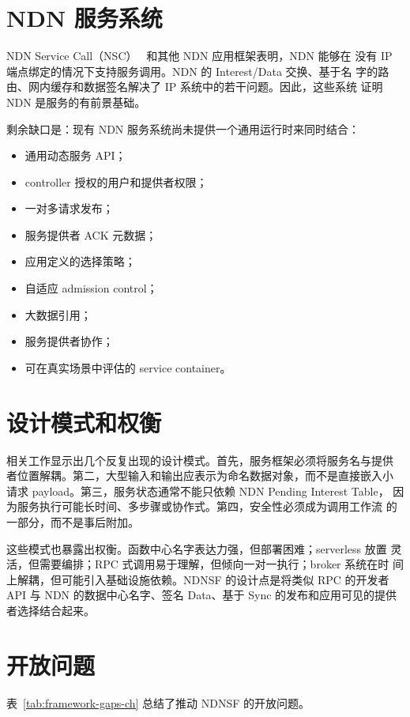 \section{NDN 服务系统}

NDN Service Call（NSC）~\cite{nsc} 和其他 NDN 应用框架表明，NDN 能够在
没有 IP 端点绑定的情况下支持服务调用。NDN 的 Interest/Data 交换、基于名
字的路由、网内缓存和数据签名解决了 IP 系统中的若干问题。因此，这些系统
证明 NDN 是服务的有前景基础。

剩余缺口是：现有 NDN 服务系统尚未提供一个通用运行时来同时结合：

\begin{itemize}
  \item 通用动态服务 API；
  \item controller 授权的用户和提供者权限；
  \item 一对多请求发布；
  \item 服务提供者 ACK 元数据；
  \item 应用定义的选择策略；
  \item 自适应 admission control；
  \item 大数据引用；
  \item 服务提供者协作；
  \item 可在真实场景中评估的 service container。
\end{itemize}

\section{设计模式和权衡}

相关工作显示出几个反复出现的设计模式。首先，服务框架必须将服务名与提供
者位置解耦。第二，大型输入和输出应表示为命名数据对象，而不是直接嵌入小
请求 payload。第三，服务状态通常不能只依赖 NDN Pending Interest Table，
因为服务执行可能长时间、多步骤或协作式。第四，安全性必须成为调用工作流
的一部分，而不是事后附加。

这些模式也暴露出权衡。函数中心名字表达力强，但部署困难；serverless 放置
灵活，但需要编排；RPC 式调用易于理解，但倾向一对一执行；broker 系统在时
间上解耦，但可能引入基础设施依赖。NDNSF 的设计点是将类似 RPC 的开发者
API 与 NDN 的数据中心名字、签名 Data、基于 Sync 的发布和应用可见的提供
者选择结合起来。

\section{开放问题}

表~\ref{tab:framework-gaps-ch} 总结了推动 NDNSF 的开放问题。

